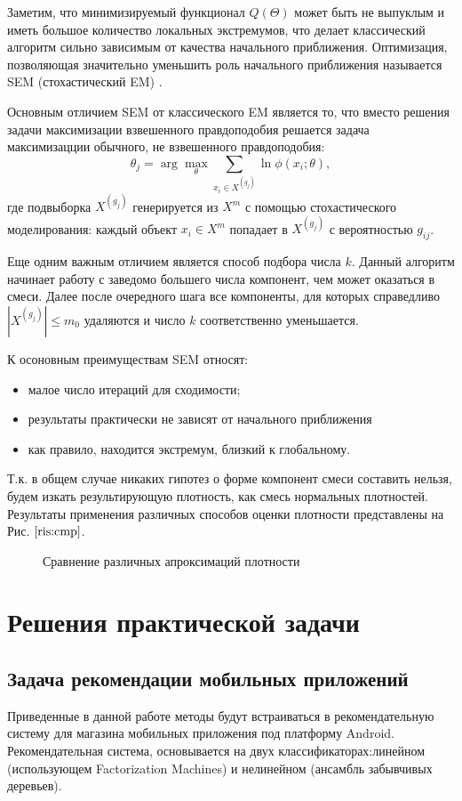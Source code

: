 \documentclass[12pt,a4paper]{report}
\begin{document}
Заметим, что минимизируемый функционал $Q(\Theta)$ может быть не выпуклым и иметь большое количество локальных экстремумов, что делает классический алгоритм сильно зависимым от качества начального приближения. Оптимизация, позволяющая значительно уменьшить роль начального приближения называется SEM (стохастический EM) \cite{Sem}.

Основным отличием SEM от классического EM является то, что вместо решения задачи максимизации взвешенного правдоподобия решается задача максимизацции обычного, не взвешенного правдоподобия:
\begin{equation*}
\theta_j = \arg \max_{\theta} \sum_{x_i \in X^{(g_j)}} \ln \phi(x_i; \theta),
\end{equation*}
где подвыборка $X^{(g_j)}$ генерируется из $X^m$ с помощью стохастического моделирования: каждый объект $x_i \in X^m$ попадает в $X^{(g_j)}$ с вероятностью $g_{ij}$.

Еще одним важным отличием является способ подбора числа $k$. Данный алгоритм начинает работу с заведомо большего числа компонент, чем может оказаться в смеси. Далее после очередного шага все компоненты, для которых справедливо $|X^{(g_j)}| \le m_0$ удаляются и число $k$ соответственно уменьшается.

К осоновным преимуществам SEM относят:
\begin{itemize}
\item малое число итераций для сходимости;
\item результаты практически не зависят от начального приближения
\item как правило, находится экстремум, близкий к глобальному.
\end{itemize}

Т.к. в общем случае никаких гипотез о форме компонент смеси составить нельзя, будем изкать результирующую плотность, как смесь нормальных плотностей. Результаты применения различных способов оценки плотности представлены на Рис.  $\ref{ris:cmp}$.

\begin{figure}[H]
\caption{Сравнение различных апроксимаций плотности}
\label{ris:cmp}
\end{figure}


\chapter{Решения практической задачи}
\section{Задача рекомендации мобильных приложений}
Приведенные в данной работе методы будут встраиваться в рекомендательную систему для магазина мобильных приложения под платформу Android. Рекомендательная система, основывается на двух классификаторах:линейном (использующем Factorization Machines) и нелинейном (ансамбль забывчивых деревьев).
\end{document}
